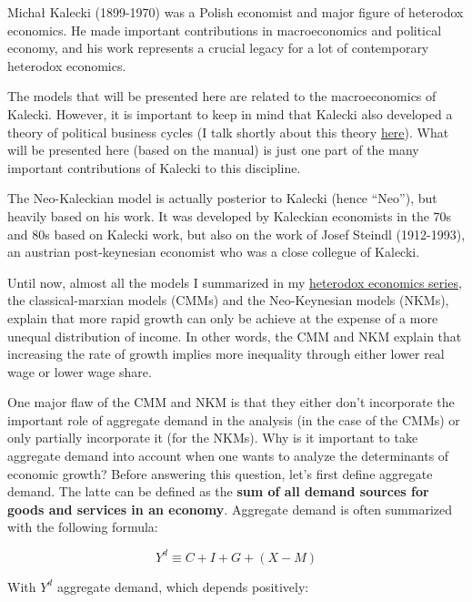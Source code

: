 \documentclass[
  letterpaper,
  DIV=11,
  numbers=noendperiod]{scrreprt}
\begin{document}
Michał Kalecki (1899-1970) was a Polish economist and major figure of
heterodox economics. He made important contributions in macroeconomics
and political economy, and his work represents a crucial legacy for a
lot of contemporary heterodox economics.

The models that will be presented here are related to the macroeconomics
of Kalecki. However, it is important to keep in mind that Kalecki also
developed a theory of political business cycles (I talk shortly about
this theory
\href{https://jeylal.github.io/myblog/posts/About\%20cycles\%20and\%20crises/cycles_crises.html}{here}).
What will be presented here (based on the manual) is just one part of
the many important contributions of Kalecki to this discipline.

The Neo-Kaleckian model is actually posterior to Kalecki (hence
``Neo''), but heavily based on his work. It was developed by Kaleckian
economists in the 70s and 80s based on Kalecki work, but also on the
work of Josef Steindl (1912-1993), an austrian post-keynesian economist
who was a close collegue of Kalecki.

Until now, almost all the models I summarized in my
\href{https://jeylal.github.io/myblog/economics.html}{heterodox
economics series}, the classical-marxian models (CMMs) and the
Neo-Keynesian models (NKMs), explain that more rapid growth can only be
achieve at the expense of a more unequal distribution of income. In
other words, the CMM and NKM explain that increasing the rate of growth
implies more inequality through either lower real wage or lower wage
share.

One major flaw of the CMM and NKM is that they either don't incorporate
the important role of aggregate demand in the analysis (in the case of
the CMMs) or only partially incorporate it (for the NKMs). Why is it
important to take aggregate demand into account when one wants to
analyze the determinants of economic growth? Before answering this
question, let's first define aggregate demand. The latte can be defined
as the \textbf{sum of all demand sources for goods and services in an
economy}. Aggregate demand is often summarized with the following
formula:

\[Y^d \equiv C+I+G+(X-M)\]

With \(Y^d\) aggregate demand, which depends positively:
\end{document}
